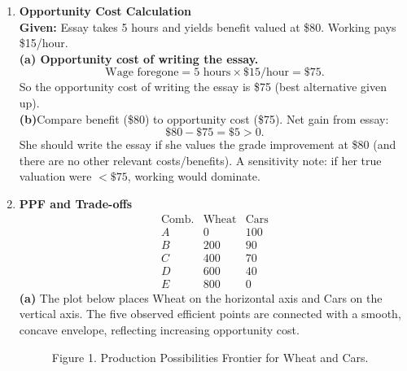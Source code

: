 \documentclass[12pt]{article}
\begin{document}
\begin{enumerate}[resume]
\item \textbf{Opportunity Cost Calculation} \\
\textbf{Given:} Essay takes 5 hours and yields benefit valued at \$80. Working pays \$15/hour. \\
\textbf{(a) Opportunity cost of writing the essay.}
\[
\text{Wage foregone} = 5 \text{ hours} \times \$15/\text{hour} = \$75.
\]
So the opportunity cost of writing the essay is \$75 (best alternative given up). \\
\textbf{(b)}Compare benefit (\$80) to opportunity cost (\$75). Net gain from essay:
\[
\$80 - \$75 = \$5 > 0.
\]
She should write the essay if she values the grade improvement at \$80 (and there are no other relevant costs/benefits). A sensitivity note: if her true valuation were \(<\$75\), working would dominate.


\newpage

\item \textbf{PPF and Trade-offs} \\

\[
\begin{array}{c|cc}
\text{Comb.} & \text{Wheat} & \text{Cars}\\\hline
A & 0 & 100\\
B & 200 & 90\\
C & 400 & 70\\
D & 600 & 40\\
E & 800 & 0
\end{array}
\]
\textbf{(a)} The plot below places Wheat on the horizontal axis and Cars on the vertical axis. The five observed efficient points are connected with a smooth, concave envelope, reflecting increasing opportunity cost.

\begin{figure}[h!]
\centering
{}
\caption*{\small Figure 1. Production Possibilities Frontier for Wheat and Cars.}
\end{figure}


\end{enumerate}
\end{document}
